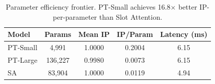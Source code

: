 \begin{table}[t]
\centering
\caption{Parameter efficiency frontier. PT-Small achieves 16.8$\times$ better IP-per-parameter than Slot Attention.}
\label{tab:param_efficiency}
\begin{tabular}{lcccc}
\toprule
Model & Params & Mean IP & IP/Param & Latency (ms) \\
\midrule
PT-Small & 4,991 & 1.0000 & 0.2004 & 6.15 \\
PT-Large & 136,227 & 0.9980 & 0.0073 & 6.15 \\
SA & 83,904 & 1.0000 & 0.0119 & 4.94 \\
\bottomrule
\end{tabular}
\end{table}